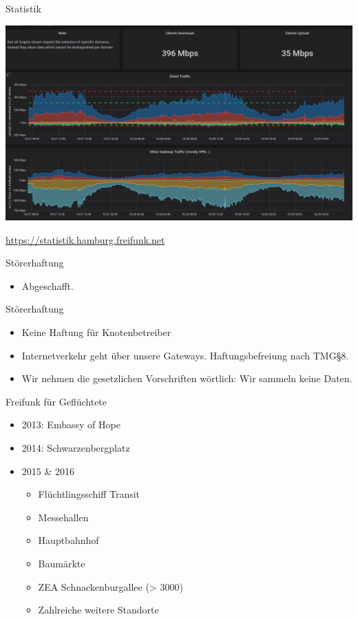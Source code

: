 \documentclass[t]{beamer}
\begin{document}
  \begin{frame}{Statistik}
    \begin{center}
      \includegraphics[width=\textwidth]{Bilder/statistik}
    \end{center}
          \small{\href{https://statistik.hamburg.freifunk.net}{https://statistik.hamburg.freifunk.net}}
  \end{frame}
  
  \begin{frame}{Störerhaftung}
    \begin{itemize}
      \item Abgeschafft.
    \end{itemize}
  \end{frame}
  
  \begin{frame}{Störerhaftung}
    \begin{itemize}
      \item Keine Haftung für Knotenbetreiber
      \item Internetverkehr geht über unsere Gateways. Haftungsbefreiung nach TMG\S8.
      \item Wir nehmen die gesetzlichen Vorschriften wörtlich: Wir sammeln keine Daten.
    \end{itemize}
  \end{frame}  
  
  \begin{frame}{Freifunk für Geflüchtete}
    \begin{itemize}
      \item 2013: Embassy of Hope
      \item 2014: Schwarzenbergplatz
      \item 2015 \& 2016
      \begin{itemize}
       \item Flüchtlingsschiff Transit
       \item Messehallen
       \item Hauptbahnhof
       \item Baumärkte
       \item ZEA Schnackenburgallee (> 3000)
       \item Zahlreiche weitere Standorte
      \end{itemize}
    \end{itemize}
  \end{frame}
  
\end{document}
